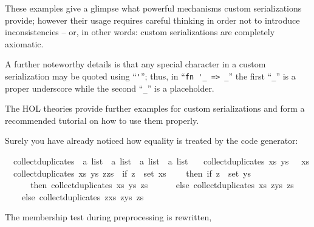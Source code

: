 \begin{isabellebody}
\begin{isamarkuptext}
\end{isamarkuptext}%
\isamarkuptrue%
%
\begin{isamarkuptext}%
These examples give a glimpse what powerful mechanisms
  custom serializations provide; however their usage
  requires careful thinking in order not to introduce
  inconsistencies -- or, in other words:
  custom serializations are completely axiomatic.

  A further noteworthy details is that any special
  character in a custom serialization may be quoted
  using ``\verb|'|''; thus, in
  ``\verb|fn '_ => _|'' the first
  ``\verb|_|'' is a proper underscore while the
  second ``\verb|_|'' is a placeholder.

  The HOL theories provide further
  examples for custom serializations and form
  a recommended tutorial on how to use them properly.%
\end{isamarkuptext}%
\isamarkuptrue%
%
\isamarkuptrue%
%
\begin{isamarkuptext}%
Surely you have already noticed how equality is treated
  by the code generator:%
\end{isamarkuptext}%
\isamarkuptrue%
\isamarkupfalse%
\isanewline
\ \ collect{\isacharunderscore}duplicates\ {\isacharcolon}{\isacharcolon}\ {\isachardoublequoteopen}{\isacharprime}a\ list\ {\isasymRightarrow}\ {\isacharprime}a\ list\ {\isasymRightarrow}\ {\isacharprime}a\ list\ {\isasymRightarrow}\ {\isacharprime}a\ list{\isachardoublequoteclose}\ \isanewline
\ \ {\isachardoublequoteopen}collect{\isacharunderscore}duplicates\ xs\ ys\ {\isacharbrackleft}{\isacharbrackright}\ {\isacharequal}\ xs{\isachardoublequoteclose}\isanewline
\ \ {\isachardoublequoteopen}collect{\isacharunderscore}duplicates\ xs\ ys\ {\isacharparenleft}z{\isacharhash}zs{\isacharparenright}\ {\isacharequal}\ {\isacharparenleft}if\ z\ {\isasymin}\ set\ xs\isanewline
\ \ \ \ then\ if\ z\ {\isasymin}\ set\ ys\isanewline
\ \ \ \ \ \ then\ collect{\isacharunderscore}duplicates\ xs\ ys\ zs\isanewline
\ \ \ \ \ \ else\ collect{\isacharunderscore}duplicates\ xs\ {\isacharparenleft}z{\isacharhash}ys{\isacharparenright}\ zs\isanewline
\ \ \ \ else\ collect{\isacharunderscore}duplicates\ {\isacharparenleft}z{\isacharhash}xs{\isacharparenright}\ {\isacharparenleft}z{\isacharhash}ys{\isacharparenright}\ zs{\isacharparenright}{\isachardoublequoteclose}%
\begin{isamarkuptext}%
The membership test during preprocessing is rewritten,

\end{isamarkuptext}
\end{isabellebody}
